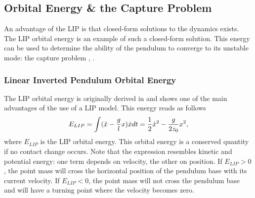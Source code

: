 \subsection{Orbital Energy \& the Capture Problem}\label{sec:ewalking}
An advantage of the \ac{LIP} is that closed-form solutions to the dynamics exists. The \ac{LIP} orbital energy is an example of such a closed-form solution. This energy can be used to determine the ability of the pendulum to converge to its unstable mode: the capture problem \cite{pratt2006capture}, \cite{koolen2012capturability}.

\subsubsection{Linear Inverted Pendulum Orbital Energy}\label{subsec:liporbit} 
The \ac{LIP} orbital energy is originally derived in \cite{kajita1992dynamic} and shows one of the main advantages of the use of a \ac{LIP} model.  This energy reads as follows
\begin{equation}
E_{LIP} = \int (\ddot{x}-\frac{g}{l}x)\dot{x} dt = \frac{1}{2}\dot{x}^2-\frac{g}{2z_0}x^2,
\label{eq:Elip}
\end{equation}
where $E_{LIP}$ is the \ac{LIP} orbital energy. This orbital energy is a conserved quantity if no contact change occurs. Note that the expression resembles kinetic and potential energy: one term depends on velocity, the other on position. If $E_{LIP}>0$, the point mass will cross the horizontal position of the pendulum base with its current velocity. If $E_{LIP}<0$, the point mass will not cross the pendulum base and will have a turning point where the velocity becomes zero.

